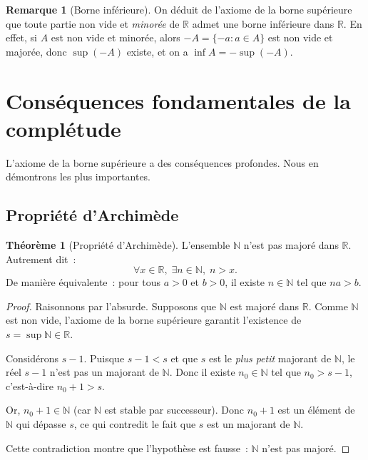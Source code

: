 \documentclass[12pt,a4paper,openany]{book}
\theoremstyle{definition}
\newtheorem{theoreme}{Théorème}[chapter]
\newtheorem{remarque}{Remarque}[chapter]
\newcommand{\N}{\mathbb{N}}
\newcommand{\R}{\mathbb{R}}
\begin{document}
\begin{remarque}[Borne inférieure]\label{rem:inf-existe}
  On déduit de l'axiome de la borne supérieure que toute partie non vide et \emph{minorée} de $\R$ admet une borne inférieure dans $\R$. En effet, si $A$ est non vide et minorée, alors $-A = \{-a : a \in A\}$ est non vide et majorée, donc $\sup(-A)$ existe, et on a $\inf A = -\sup(-A)$.
\end{remarque}


\section{Conséquences fondamentales de la complétude}
\label{sec:consequences}

L'axiome de la borne supérieure a des conséquences profondes. Nous en démontrons les plus importantes.

\subsection{Propriété d'Archimède}

\begin{theoreme}[Propriété d'Archimède]\label{thm:archimede}
  L'ensemble $\N$ n'est pas majoré dans $\R$. Autrement dit~:
  \[
    \forall x \in \R,\; \exists n \in \N,\; n > x.
  \]
  De manière équivalente~: pour tous $a > 0$ et $b > 0$, il existe $n \in \N$ tel que $na > b$.
\end{theoreme}

\begin{proof}
  Raisonnons par l'absurde. Supposons que $\N$ est majoré dans $\R$. Comme $\N$ est non vide, l'axiome de la borne supérieure garantit l'existence de $s = \sup \N \in \R$.

  Considérons $s - 1$. Puisque $s - 1 < s$ et que $s$ est le \emph{plus petit} majorant de $\N$, le réel $s - 1$ n'est pas un majorant de $\N$. Donc il existe $n_0 \in \N$ tel que $n_0 > s - 1$, c'est-à-dire $n_0 + 1 > s$.

  Or, $n_0 + 1 \in \N$ (car $\N$ est stable par successeur). Donc $n_0 + 1$ est un élément de $\N$ qui dépasse $s$, ce qui contredit le fait que $s$ est un majorant de $\N$.

  Cette contradiction montre que l'hypothèse est fausse~: $\N$ n'est pas majoré.
\end{proof}
\end{document}
